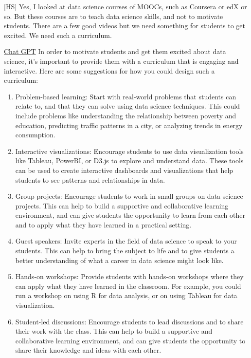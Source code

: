 \documentclass[
]{book}
\providecommand{\tightlist}{%
  \setlength{\itemsep}{0pt}\setlength{\parskip}{0pt}}
\theoremstyle{definition}
\theoremstyle{definition}
\theoremstyle{definition}
\theoremstyle{definition}
\theoremstyle{remark}
\begin{document}
{[}HS{]} Yes, I looked at data science courses of MOOCs, such as Coursera or edX or so. But these courses are to teach data science skills, and not to motivate students. There are a few good videos but we need something for students to get excited. We need such a curriculum.

\protect\hyperlink{chatgpt}{Chat GPT} In order to motivate students and get them excited about data science, it's important to provide them with a curriculum that is engaging and interactive. Here are some suggestions for how you could design such a curriculum:

\begin{enumerate}
\def\labelenumi{\arabic{enumi}.}
\tightlist
\item
  Problem-based learning: Start with real-world problems that students can relate to, and that they can solve using data science techniques. This could include problems like understanding the relationship between poverty and education, predicting traffic patterns in a city, or analyzing trends in energy consumption.
\item
  Interactive visualizations: Encourage students to use data visualization tools like Tableau, PowerBI, or D3.js to explore and understand data. These tools can be used to create interactive dashboards and visualizations that help students to see patterns and relationships in data.
\item
  Group projects: Encourage students to work in small groups on data science projects. This can help to build a supportive and collaborative learning environment, and can give students the opportunity to learn from each other and to apply what they have learned in a practical setting.
\item
  Guest speakers: Invite experts in the field of data science to speak to your students. This can help to bring the subject to life and to give students a better understanding of what a career in data science might look like.
\item
  Hands-on workshops: Provide students with hands-on workshops where they can apply what they have learned in the classroom. For example, you could run a workshop on using R for data analysis, or on using Tableau for data visualization.
\item
  Student-led discussions: Encourage students to lead discussions and to share their work with the class. This can help to build a supportive and collaborative learning environment, and can give students the opportunity to share their knowledge and ideas with each other.
\end{enumerate}
\end{document}

